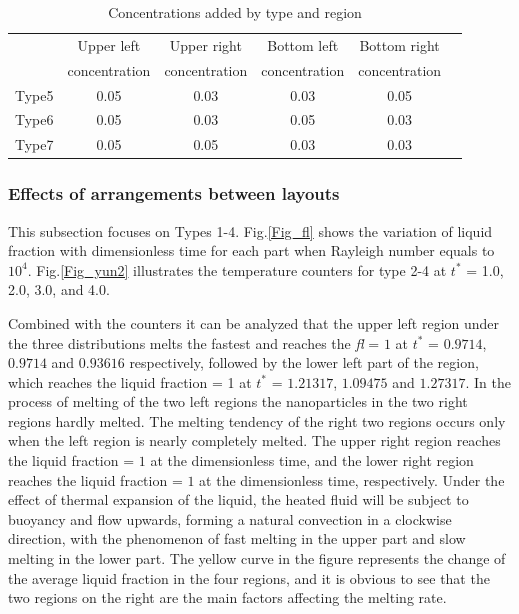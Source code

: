 \documentclass[preprint,12pt]{elsarticle}
\begin{document}
\begin{table}[H]
	\centering
	\footnotesize
	\caption{Concentrations added by type and region}
	\begin{tabular}{cccccc}
		\toprule
		& Upper left  & Upper right  & Bottom left  & Bottom right  \\
		& concentration  & concentration  & concentration  & concentration  \\
		\midrule
		Type5 & 0.05 & 0.03  & 0.03   & 0.05   \\
		Type6 & 0.05 & 0.03  & 0.05   & 0.03   \\
		Type7 & 0.05 & 0.05  & 0.03   & 0.03   \\
		\bottomrule
	\end{tabular}
	\label{typee}		
\end{table}

\subsubsection{Effects of arrangements between layouts}
This subsection focuses on Types 1-4. Fig.\ref{Fig_fl} shows the variation of liquid fraction with dimensionless time for each part when Rayleigh number equals to $ 10^4 $. Fig.\ref{Fig_yun2}  illustrates the temperature counters for type 2-4 at \textit{$ t^* $} = 1.0, 2.0, 3.0, and 4.0.

Combined with the counters it can be analyzed that the upper left region under the three distributions melts the fastest and reaches the \textit{fl} = $ 1 $ at \textit{$ t^* $} = $ 0.9714 $, $ 0.9714 $ and $ 0.93616 $ respectively, followed by the lower left part of the region, which reaches the liquid fraction = 1 at \textit{$ t^* $} = $ 1.21317 $, $ 1.09475 $ and $ 1.27317 $. In the process of melting of the two left regions the nanoparticles in the two right regions hardly melted. The melting tendency of the right two regions occurs only when the left region is nearly completely melted. The upper right region reaches the liquid fraction = $ 1 $ at the dimensionless time, and the lower right region reaches the liquid fraction = $  1 $ at the dimensionless time, respectively. Under the effect of thermal expansion of the liquid, the heated fluid will be subject to buoyancy and flow upwards, forming a natural convection in a clockwise direction, with the phenomenon of fast melting in the upper part and slow melting in the lower part. The yellow curve in the figure represents the change of the average liquid fraction in the four regions, and it is obvious to see that the two regions on the right are the main factors affecting the melting rate.
\end{document}

